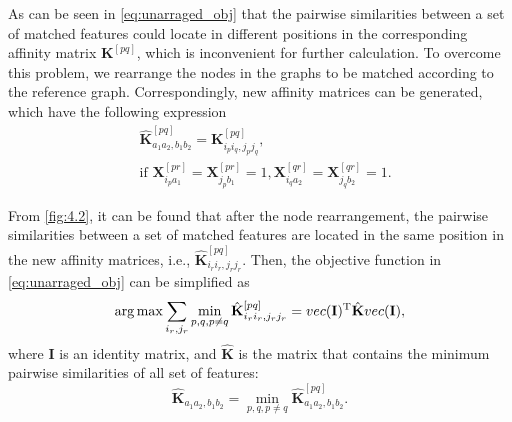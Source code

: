 As can be seen in \cref{eq:unarraged_obj} that the pairwise similarities between a set of matched features could locate in different positions in the corresponding affinity matrix $\mathbf K^{[pq]}$, which is inconvenient for further calculation. To overcome this problem, we rearrange the nodes in the graphs to be matched according to the reference graph. Correspondingly, new affinity matrices can be generated, which have the following expression
\begin{equation}
    \begin{split}
        & \hat{\mathbf K}^{[pq]}_{a_1a_2, b_1b_2} = \mathbf K^{[pq]}_{i_pi_q, j_pj_q}, \\
        & \text{if } \mathbf X^{[pr]}_{i_pa_1} = \mathbf X^{[pr]}_{j_pb_1} = 1, \mathbf X^{[qr]}_{i_qa_2} = \mathbf X^{[qr]}_{j_qb_2} = 1.
    \end{split}
\end{equation}

From \cref{fig:4.2}, it can be found that after the node rearrangement, the pairwise similarities between a set of matched features are located in the same position in the new affinity matrices, i.e., $\hat{\mathbf K}^{[pq]}_{i_ri_r,j_rj_r}$. Then, the objective function in \cref{eq:unarraged_obj} can be simplified as 
\begin{equation}
    \arg\max \sum_{i_r,j_r} \min_{p, q, p \neq q} \hat{\mathbf K}^{[pq]}_{i_ri_r, j_rj_r} = vec(\mathbf I)^{\rm T} \hat{\mathbf K} vec(\mathbf I),
\end{equation}
where $\mathbf I$ is an identity matrix, and $\hat{\mathbf K}$ is the matrix that contains the minimum pairwise similarities of all set of features:
\begin{equation}
    \hat{\mathbf K}_{a_1a_2,b_1b_2} = \min_{p, q, p \neq q} \hat{\mathbf K}^{[pq]}_{a_1a_2,b_1b_2}.
\end{equation}

